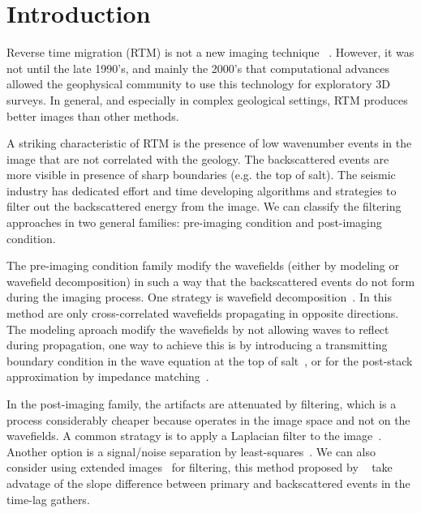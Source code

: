 \section{Introduction}

Reverse time migration (RTM) is not a new imaging technique ~\citep{baysal:1514, whitmore:382, GPR:GPR413}.
However, it was not until the late 1990’s, and mainly the 2000’s that computational
 advances allowed the geophysical community to use this technology for exploratory
3D surveys. In general, and especially in complex geological settings, RTM produces better 
images than other methods. 

A striking characteristic of RTM is the presence of low wavenumber events in the image that
 are not correlated with the geology. The backscattered events are more visible in
presence of sharp boundaries (e.g. the top of salt). The seismic industry has dedicated effort and time developing algorithms and strategies
to filter out the backscattered energy from the image. We can classify the filtering
 approaches in two general families: pre-imaging condition and post-imaging condition. 

The pre-imaging condition family modify the wavefields (either by modeling or wavefield decomposition)
 in such a way that the backscattered events do not form during the imaging process.
One strategy is wavefield decomposition~\citep[]{liu:S29,fei:3130}. In this method are only cross-correlated
 wavefields propagating in opposite directions. The modeling aproach modify the wavefields by not
allowing waves to reflect during propagation, one way to achieve this is by introducing a transmitting
boundary condition in the wave equation at the top of salt~\citep{fletcher:2049}, or for the post-stack
approximation by impedance matching~\citep{baysal:132}. 


In the post-imaging family, the artifacts are attenuated by filtering, which is a process
 considerably cheaper because operates in the image space and not on the wavefields. A common
stratagy is to apply a Laplacian filter to the image~\citep{youn:246}. Another option
is a signal/noise separation by least-squares~\citep{guitton:S19}. We can also consider using
extended images~\citep{rickett:883,sava:S209,GPR:GPR888} for filtering, this method proposed
by ~\cite{kaelin:3125} take advatage of the slope difference between primary and 
backscattered events in the time-lag gathers.

